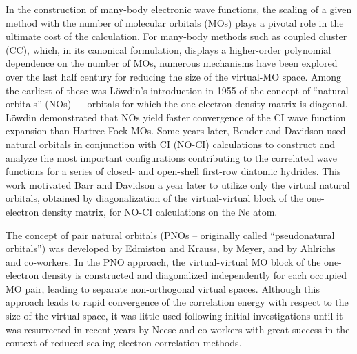 \documentclass[11pt,article]{achemso}
\begin{document}
In the construction of many-body electronic wave functions, the scaling of a
given method with the number of molecular orbitals (MOs) plays a pivotal role
in the ultimate cost of the calculation.  For many-body methods such as
coupled cluster (CC),\cite{Shavitt09,Gauss98,Crawford00:review} which, in its
canonical formulation, displays a higher-order polynomial dependence on the
number of MOs, numerous mechanisms have been explored over the last half
century for reducing the size of the virtual-MO space.  Among the earliest of
these was L{\"o}wdin's\cite{Lowdin55} introduction in 1955 of the concept of
``natural orbitals'' (NOs) --- orbitals for which the one-electron density
matrix is diagonal.  L\"owdin demonstrated that NOs yield faster convergence
of the CI wave function expansion than Hartree-Fock MOs.  Some years later,
Bender and Davidson\cite{Bender69} used natural orbitals in conjunction with
CI (NO-CI) calculations to construct and analyze the most important
configurations contributing to the correlated wave functions for a series of
closed- and open-shell first-row diatomic hydrides.  This work motivated Barr
and Davidson a year later\cite{Barr70} to utilize only the virtual natural
orbitals, obtained by diagonalization of the virtual-virtual block of
the one-electron density matrix, for NO-CI calculations on the Ne atom.

The concept of pair natural orbitals (PNOs -- originally called
``pseudonatural orbitals'') was developed by Edmiston and
Krauss,\cite{Edmiston66} by Meyer\cite{Meyer73}, and by Ahlrichs and
co-workers.\cite{Ahlrichs75} In the PNO approach, the virtual-virtual MO block
of the one-electron density is constructed and diagonalized independently for
each occupied MO pair, leading to separate non-orthogonal virtual spaces.
Although this approach leads to rapid convergence of the correlation energy
with respect to the size of the virtual space, it was little used following
initial investigations until it was resurrected in recent years by Neese and
co-workers with great success in the context of reduced-scaling electron
correlation methods.\cite{Neese09,Riplinger16}
\end{document}
